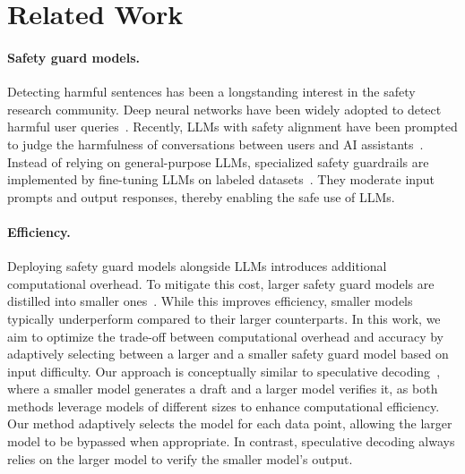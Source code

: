 \section{Related Work}
\vspace{-0.05in}
\paragraph{Safety guard models.} Detecting harmful sentences has been a longstanding interest in the safety research community. Deep neural networks have been widely adopted to detect harmful user queries~\citep{hatebert, offensive-reddit, roberta-hate-speech}. Recently, LLMs with safety alignment have been prompted to judge the harmfulness of conversations between users and AI assistants~\citep{chao2024jailbreakbench}. 
Instead of relying on general-purpose LLMs, specialized safety guardrails are implemented by fine-tuning LLMs on labeled datasets~\citep{granite-guardian, wildguard, harmaug, metallamaguard3}. 
They moderate input prompts and output responses, thereby enabling the safe use of LLMs. 

\vspace{-0.05in}
\paragraph{Efficiency.} Deploying safety guard models alongside LLMs introduces additional computational overhead. To mitigate this cost, larger safety guard models are distilled into smaller ones~\citep{metallamaguard3, harmaug}. While this improves efficiency, smaller models typically underperform compared to their larger counterparts.
In this work, we aim to optimize the trade-off between computational overhead and accuracy by adaptively selecting between a larger and a smaller safety guard model based on input difficulty. Our approach is conceptually similar to speculative decoding~\citep{speculative-decoding, speculative-decoding-2, speculative-decoding-3}, where a smaller model generates a draft and a larger model verifies it, as both methods leverage models of different sizes to enhance computational efficiency.
Our method adaptively selects the model for each data point, allowing the larger model to be bypassed when appropriate. 
In contrast, speculative decoding always relies on the larger model to verify the smaller model’s output.
